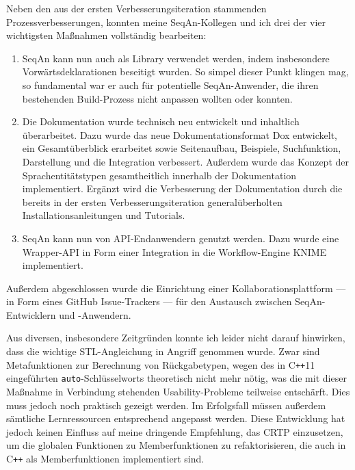 Neben den aus der ersten Verbesserungsiteration stammenden Prozessverbesserungen, konnten meine SeqAn-Kollegen und ich drei der vier wichtigsten Maßnahmen vollständig bearbeiten:
\begin{enumerate}
  \item SeqAn kann nun auch als Library verwendet werden, indem insbesondere Vorwärtsdeklarationen beseitigt wurden. So simpel dieser Punkt klingen mag, so fundamental war er auch für potentielle SeqAn-Anwender, die ihren bestehenden Build-Prozess nicht anpassen wollten oder konnten. 
  \item Die Dokumentation wurde technisch neu entwickelt und inhaltlich überarbeitet. Dazu wurde das neue Dokumentationsformat Dox entwickelt, ein Gesamtüberblick erarbeitet sowie Seitenaufbau, Beispiele, Suchfunktion, Darstellung und die Integration verbessert. Außerdem wurde das Konzept der Sprachentitätstypen gesamtheitlich innerhalb der Dokumentation implementiert. Ergänzt wird die Verbesserung der Dokumentation durch die bereits in der ersten Verbesserungsiteration generalüberholten Installationsanleitungen und Tutorials.
  \item SeqAn kann nun von API-Endanwendern genutzt werden. Dazu wurde eine Wrapper-API in Form einer Integration in die Workflow-Engine KNIME implementiert.%
\end{enumerate}

Außerdem abgeschlossen wurde die Einrichtung einer Kollaborationsplattform --- in Form eines GitHub Issue-Trackers --- für den Austausch zwischen SeqAn-Entwicklern und -Anwendern.

Aus diversen, insbesondere Zeitgründen konnte ich leider nicht darauf hinwirken, dass die wichtige STL-Angleichung in Angriff genommen wurde. Zwar sind Metafunktionen zur Berechnung von Rückgabetypen, wegen des in C\texttt{++}11 eingeführten \texttt{auto}-Schlüsselworts theoretisch nicht mehr nötig, was die mit dieser Maßnahme in Verbindung stehenden Usability-Probleme teilweise entschärft. Dies muss jedoch noch praktisch gezeigt werden. Im Erfolgsfall müssen außerdem sämtliche Lernressourcen entsprechend angepasst werden. Diese Entwicklung hat jedoch keinen Einfluss auf meine dringende Empfehlung, das CRTP einzusetzen, um die globalen Funktionen zu Memberfunktionen zu refaktorisieren, die auch in C\texttt{++} als Memberfunktionen implementiert sind.

